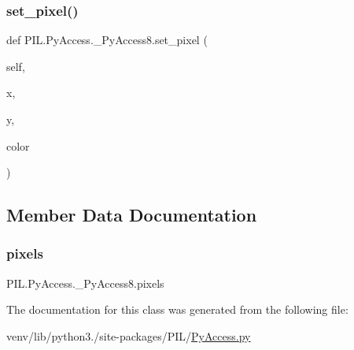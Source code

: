 \subsubsection{\texorpdfstring{set\+\_\+pixel()}{set\_pixel()}}
{\footnotesize\ttfamily def P\+I\+L.\+Py\+Access.\+\_\+\+Py\+Access8.\+set\+\_\+pixel (\begin{DoxyParamCaption}\item[{}]{self,  }\item[{}]{x,  }\item[{}]{y,  }\item[{}]{color }\end{DoxyParamCaption})}



\subsection{Member Data Documentation}
\mbox{\label{classPIL_1_1PyAccess_1_1__PyAccess8_aff5d41b6a2418e01a4f796fb68bfc487}} 
\subsubsection{\texorpdfstring{pixels}{pixels}}
{\footnotesize\ttfamily P\+I\+L.\+Py\+Access.\+\_\+\+Py\+Access8.\+pixels}



The documentation for this class was generated from the following file\+:\begin{DoxyCompactItemize}
\item 
venv/lib/python3./site-\/packages/\+P\+I\+L/\hyperlink{PyAccess_8py}{Py\+Access.\+py}\end{DoxyCompactItemize}
